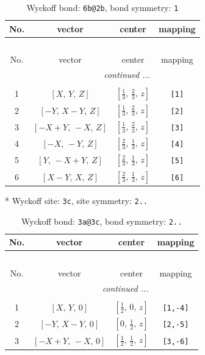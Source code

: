 \documentclass[fleqn,8pt]{jsarticle}
\begin{document}
\renewcommand{\arraystretch}{1.2}
\begin{longtable}{cccc}
\caption{Wyckoff bond: {\tt 6b@2b}, bond symmetry: {\tt 1}}
 \\
 \hline \hline
No. & vector & center & mapping \\ \hline \endfirsthead

\multicolumn{3}{l}{\tablename\ \thetable{}} \\
 \hline \hline
No. & vector & center & mapping \\ \hline \endhead

 \hline \hline
\multicolumn{3}{r}{\footnotesize\it continued ...} \\ \endfoot

 \hline \hline
\multicolumn{3}{r}{} \\ \endlastfoot

1 & $\left[ X,\, Y,\, Z \right]$ & $\left[ \frac{1}{3},\, \frac{2}{3},\, z \right]$ & {\tt [1]} \\ \hline
2 & $\left[ - Y,\, X - Y,\, Z \right]$ & $\left[ \frac{1}{3},\, \frac{2}{3},\, z \right]$ & {\tt [2]} \\ \hline
3 & $\left[ - X + Y,\, - X,\, Z \right]$ & $\left[ \frac{1}{3},\, \frac{2}{3},\, z \right]$ & {\tt [3]} \\ \hline
4 & $\left[ - X,\, - Y,\, Z \right]$ & $\left[ \frac{2}{3},\, \frac{1}{3},\, z \right]$ & {\tt [4]} \\ \hline
5 & $\left[ Y,\, - X + Y,\, Z \right]$ & $\left[ \frac{2}{3},\, \frac{1}{3},\, z \right]$ & {\tt [5]} \\ \hline
6 & $\left[ X - Y,\, X,\, Z \right]$ & $\left[ \frac{2}{3},\, \frac{1}{3},\, z \right]$ & {\tt [6]} \\
\end{longtable}
* Wyckoff site: {\tt 3c}, site symmetry: {\tt 2..}
\renewcommand{\arraystretch}{1.2}
\begin{longtable}{cccc}
\caption{Wyckoff bond: {\tt 3a@3c}, bond symmetry: {\tt 2..}}
 \\
 \hline \hline
No. & vector & center & mapping \\ \hline \endfirsthead

\multicolumn{3}{l}{\tablename\ \thetable{}} \\
 \hline \hline
No. & vector & center & mapping \\ \hline \endhead

 \hline \hline
\multicolumn{3}{r}{\footnotesize\it continued ...} \\ \endfoot

 \hline \hline
\multicolumn{3}{r}{} \\ \endlastfoot

1 & $\left[ X,\, Y,\, 0 \right]$ & $\left[ \frac{1}{2},\, 0,\, z \right]$ & {\tt [1,-4]} \\ \hline
2 & $\left[ - Y,\, X - Y,\, 0 \right]$ & $\left[ 0,\, \frac{1}{2},\, z \right]$ & {\tt [2,-5]} \\ \hline
3 & $\left[ - X + Y,\, - X,\, 0 \right]$ & $\left[ \frac{1}{2},\, \frac{1}{2},\, z \right]$ & {\tt [3,-6]} \\
\end{longtable}
\end{document}

